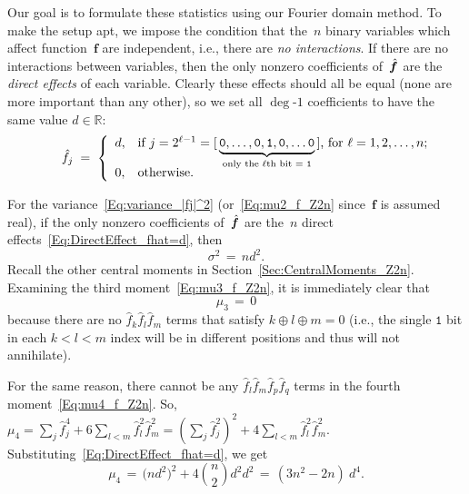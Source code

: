 \documentclass[letterpaper,11pt]{article}
\newcommand{\bs}[1]{{\boldsymbol{#1}}}
\newcommand{\gr}[1]{( #1 )}
\newcommand{\Gr}[1]{\big( #1 \big)}
\newcommand{\AutoGroup}[1]{\left( #1 \right)}
\newcommand{\vect}[1]{[ #1 ]}
\newcommand{\Real}{\mathbb R}
\newcommand{\bcode}[1]{\texttt{#1}}
\newcommand{\hatbsf}{{\kern+0.25em}\hat{{\kern-0.25em}\bs{f}}}
\theoremstyle{definition} \newtheorem{remark}{Remark}
\begin{document}
Our goal is to formulate these statistics using our Fourier domain method. To make the setup apt, we impose the condition that the~$n$ binary variables which affect function~$\bs{f}$ are independent, i.e., there are \emph{no interactions}. If there are no interactions between variables, then the only nonzero coefficients of~$\hatbsf$ are the \emph{direct effects} of each variable. Clearly these effects should all be equal (none are more important than any other), so we set all $\deg$-$1$ coefficients to have the same value $d\in\Real$:
\begin{equation} \label{Eq:DirectEffect_fhat=d}
\qquad
\hat{f}_j \;=\;
\left\{
  \begin{array}{ll}
    d, & \hbox{if $j=2^{\ell-1} = \vect{\,\underbrace{\bcode{0},\ldots,\bcode{0},\bcode{1},\bcode{0},\ldots\bcode{0}}_{\text{only the $\ell$th bit = \bcode{1}}}\,}$, for $\ell=1,2,\ldots,n$;} \\[-3pt]
    0, & \hbox{otherwise.}
  \end{array}
\right.
\end{equation}

For the variance~\eqref{Eq:variance_|fj|^2} (or~\eqref{Eq:mu2_f_Z2n} since~$\bs{f}$ is assumed real), if the only nonzero coefficients of~$\hatbsf$ are the~$n$ direct effects~\eqref{Eq:DirectEffect_fhat=d}, then
\begin{equation} \label{Eq:var_binom}
\sigma^2 \,=\, nd^2.
\end{equation}
Recall the other central moments in Section~\ref{Sec:CentralMoments_Z2n}. Examining the third moment~\eqref{Eq:mu3_f_Z2n}, it is immediately clear that
\begin{equation} \label{Eq:mu3_binom}
\mu_3 \,=\, 0
\end{equation}
because there are no $\hat{f}_k \hat{f}_l \hat{f}_m$ terms that satisfy $k \oplus l \oplus m = 0$ (i.e., the single $\bcode{1}$ bit in each $k < l < m$ index will be in different positions and thus will not annihilate).

For the same reason, there cannot be any $\hat{f}_l \hat{f}_m \hat{f}_p \hat{f}_q$ terms in the fourth moment~\eqref{Eq:mu4_f_Z2n}. So, $\mu_4 = \sum_j \hat{f}_j^4 + 6 \sum_{l<m} \hat{f}_l^2 \hat{f}_m^2 = \AutoGroup{\sum_j \hat{f}_j^2}^2 + 4 \sum_{l<m} \hat{f}_l^2 \hat{f}_m^2$. Substituting~\eqref{Eq:DirectEffect_fhat=d}, we get
\begin{equation} \label{Eq:mu4_binom}
\mu_4 \,=\, \Gr{n d^2}^2 + 4\displaystyle\binom{n}{2}d^2d^2 \,=\, \gr{3n^2 - 2n} \:\! d^4.
\end{equation}
\end{document}
